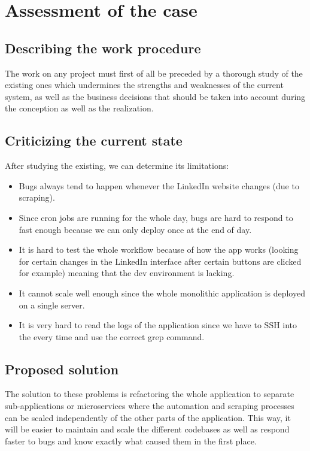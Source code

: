 \section{Assessment of the case}
\subsection{Describing the work procedure}
The work on any project must first of all be preceded by a thorough study of the existing ones which undermines the strengths and weaknesses of the current system, as well as the business decisions that should be taken into account during the conception as well as the realization.
\subsection{Criticizing the current state}
After studying the existing, we can determine its limitations:
\begin{itemize}
    \item Bugs always tend to happen whenever the LinkedIn website changes (due to scraping).
    \item Since cron jobs are running for the whole day, bugs are hard to respond to fast enough because we can only deploy once at the end of day.
    \item It is hard to test the whole workflow because of how the app works (looking for certain changes in the LinkedIn interface after certain buttons are clicked for example) meaning that the dev environment is lacking.
    \item It cannot scale well enough since the whole monolithic application is deployed on a single server.
    \item It is very hard to read the logs of the application since we have to SSH into the  every time and use the correct grep command.
\end{itemize}
\subsection{Proposed solution}
The solution to these problems is refactoring the whole application to separate sub-applications or microservices where the automation and scraping processes can be scaled independently of the other parts of the application.
This way, it will be easier to maintain and scale the different codebases as well as respond faster to bugs and know exactly what caused them in the first place.

